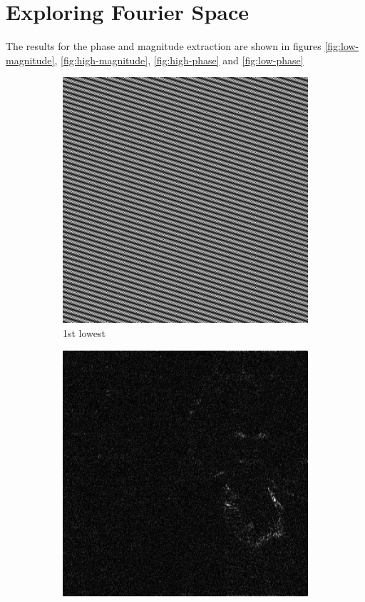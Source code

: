 \section{Exploring Fourier Space}

The results for the phase and magnitude extraction are shown in figures \ref{fig:low-magnitude}, \ref{fig:high-magnitude}, \ref{fig:high-phase} and \ref{fig:low-phase}

\begin{figure}[h!]
\centering
\begin{subfigure}{0.2\textwidth}
  \centering
  \includegraphics[width=0.95\linewidth]{output/magnitud_low_1.jpg}
  \caption{1st lowest}
\end{subfigure}%
\begin{subfigure}{0.2\textwidth}
  \centering
  \includegraphics[width=0.95\linewidth]{output/magnitud_low_25.jpg}

\end{subfigure}
\end{figure}
